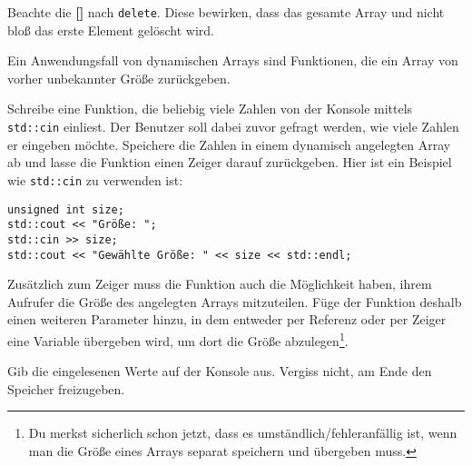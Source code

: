 Beachte die \textbf{[]} nach \texttt{delete}.
Diese bewirken, dass das gesamte Array und nicht bloß das erste Element gelöscht wird.

Ein Anwendungsfall von dynamischen Arrays sind Funktionen, die ein Array von vorher unbekannter Größe zurückgeben.

Schreibe eine Funktion, die beliebig viele Zahlen von der Konsole mittels \texttt{std::cin} einliest.
Der Benutzer soll dabei zuvor gefragt werden, wie viele Zahlen er eingeben möchte.
Speichere die Zahlen in einem dynamisch angelegten Array ab und lasse die Funktion einen Zeiger darauf zurückgeben.
Hier ist ein Beispiel wie \texttt{std::cin} zu verwenden ist:

\begin{lstlisting}
unsigned int size;
std::cout << "Größe: ";
std::cin >> size;
std::cout << "Gewählte Größe: " << size << std::endl;
\end{lstlisting}

Zusätzlich zum Zeiger muss die Funktion auch die Möglichkeit haben, ihrem Aufrufer die Größe des angelegten Arrays mitzuteilen.
Füge der Funktion deshalb einen weiteren Parameter hinzu, in dem entweder per Referenz oder per Zeiger eine Variable übergeben wird, um dort die Größe abzulegen\footnote{Du merkst sicherlich schon jetzt, dass es umständlich/fehleranfällig ist, wenn man die Größe eines Arrays separat speichern und übergeben muss.}.

Gib die eingelesenen Werte auf der Konsole aus.
Vergiss nicht, am Ende den Speicher freizugeben.
